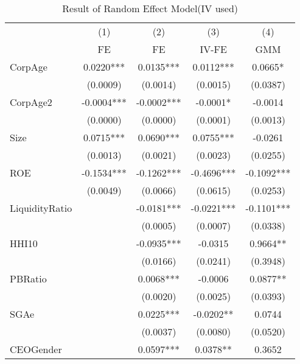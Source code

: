 \begin{table}[htbp]\centering
\def\sym#1{\ifmmode^{#1}\else\(^{#1}\)\fi}
\caption{Result of Random Effect Model(IV used) \label{tab:regressionRE}}
\begin{tabular}{l*{4}{c}}
\hline\hline
            &\multicolumn{1}{c}{(1)}&\multicolumn{1}{c}{(2)}&\multicolumn{1}{c}{(3)}&\multicolumn{1}{c}{(4)}\\
            &\multicolumn{1}{c}{FE}&\multicolumn{1}{c}{FE}&\multicolumn{1}{c}{IV-FE}&\multicolumn{1}{c}{GMM}\\
\hline
CorpAge     &      0.0220***&      0.0135***&      0.0112***&      0.0665*  \\
            &    (0.0009)   &    (0.0014)   &    (0.0015)   &    (0.0387)   \\
[1em]
CorpAge2    &     -0.0004***&     -0.0002***&     -0.0001*  &     -0.0014   \\
            &    (0.0000)   &    (0.0000)   &    (0.0001)   &    (0.0013)   \\
[1em]
Size        &      0.0715***&      0.0690***&      0.0755***&     -0.0261   \\
            &    (0.0013)   &    (0.0021)   &    (0.0023)   &    (0.0255)   \\
[1em]
ROE         &     -0.1534***&     -0.1262***&     -0.4696***&     -0.1092***\\
            &    (0.0049)   &    (0.0066)   &    (0.0615)   &    (0.0253)   \\
[1em]
LiquidityRatio&               &     -0.0181***&     -0.0221***&     -0.1101***\\
            &               &    (0.0005)   &    (0.0007)   &    (0.0338)   \\
[1em]
HHI10       &               &     -0.0935***&     -0.0315   &      0.9664** \\
            &               &    (0.0166)   &    (0.0241)   &    (0.3948)   \\
[1em]
PBRatio     &               &      0.0068***&     -0.0006   &      0.0877** \\
            &               &    (0.0020)   &    (0.0025)   &    (0.0393)   \\
[1em]
SGAe        &               &      0.0225***&     -0.0202** &      0.0744   \\
            &               &    (0.0037)   &    (0.0080)   &    (0.0520)   \\
[1em]
CEOGender   &               &      0.0597***&      0.0378** &      0.3652   \\

\end{tabular}
\end{table}
